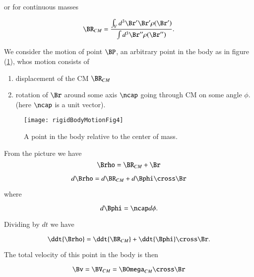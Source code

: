 or for continuous masses

\begin{equation}\label{eqn:rigidBodyMotion:80}
\BR_{CM} = \frac{\int_V d^3 \Br' \Br' \rho(\Br')}{ \int d^3 \Br'' \rho(\Br'')}.
\end{equation}

We consider the motion of point $\BP$, an arbitrary point in the body as in figure (\ref{fig:rigidBodyMotion:rigidBodyMotionFig4}), whos motion consists of

\begin{enumerate}
\item displacement of the CM $\BR_{CM}$
\item rotation of $\Br$ around some axis $\ncap$ going through CM on some angle $\phi$. (here $\ncap$ is a unit vector).
\end{enumerate}

\begin{figure}[htp]
   \centering
   \texttt{[image: rigidBodyMotionFig4]}
   \caption{A point in the body relative to the center of mass.}\label{fig:rigidBodyMotion:rigidBodyMotionFig4}
\end{figure}

From the picture we have
\begin{equation}\label{eqn:rigidBodyMotion:100}
\Brho = \BR_{CM} + \Br
\end{equation}

\begin{equation}\label{eqn:rigidBodyMotion:120}
d\Brho = d\BR_{CM} + d\Bphi \cross \Br
\end{equation}

where

\begin{equation}\label{eqn:rigidBodyMotion:140}
d\Bphi = \ncap d\phi.
\end{equation}

Dividing by $dt$ we have

\begin{equation}\label{eqn:rigidBodyMotion:160}
\ddt{\Brho} = \ddt{\BR_{CM}} + \ddt{\Bphi} \cross \Br.
\end{equation}

The total velocity of this point in the body is then

\begin{equation}\label{eqn:rigidBodyMotion:180}
\Bv = \BV_{CM} = \BOmega_{CM} \cross \Br
\end{equation}

